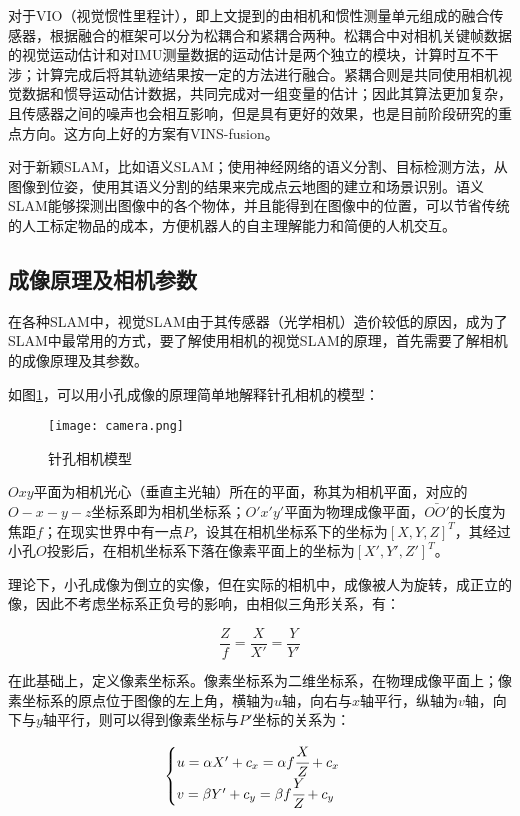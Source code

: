 对于VIO（视觉惯性里程计），即上文提到的由相机和惯性测量单元组成的融合传感器，根据融合的框架可以分为松耦合和紧耦合两种。松耦合中对相机关键帧数据的视觉运动估计和对IMU测量数据的运动估计是两个独立的模块，计算时互不干涉；计算完成后将其轨迹结果按一定的方法进行融合。紧耦合则是共同使用相机视觉数据和惯导运动估计数据，共同完成对一组变量的估计\cite{qin2018vins}；因此其算法更加复杂，且传感器之间的噪声也会相互影响，但是具有更好的效果，也是目前阶段研究的重点方向。这方向上好的方案有VINS-fusion。


对于新颖SLAM，比如语义SLAM；使用神经网络的语义分割、目标检测方法，从图像到位姿，使用其语义分割的结果来完成点云地图的建立和场景识别。语义SLAM能够探测出图像中的各个物体，并且能得到在图像中的位置，可以节省传统的人工标定物品的成本，方便机器人的自主理解能力和简便的人机交互\cite{任伟建2022移动机器人同步定位与建图技术综述}。


\subsection{成像原理及相机参数} \label{3.1.2}
在各种SLAM中，视觉SLAM由于其传感器（光学相机）造价较低的原因，成为了SLAM中最常用的方式，要了解使用相机的视觉SLAM的原理，首先需要了解相机的成像原理及其参数。

如图\ref{fig4}，可以用小孔成像的原理简单地解释针孔相机的模型：
\begin{figure}[!ht]
	\centering
	\texttt{[image: camera.png]}
	\caption{针孔相机模型} 
	\label{fig4}
\end{figure}

$Oxy$平面为相机光心（垂直主光轴）所在的平面，称其为相机平面，对应的$O-x-y-z$坐标系即为相机坐标系；$O'x'y'$平面为物理成像平面，$\bar{OO'}$的长度为焦距$f$；在现实世界中有一点$P$，设其在相机坐标系下的坐标为$[X, Y, Z]^T$，其经过小孔$O$投影后，在相机坐标系下落在像素平面上的坐标为$[X', Y', Z']^T$。

理论下，小孔成像为倒立的实像，但在实际的相机中，成像被人为旋转，成正立的像，因此不考虑坐标系正负号的影响，由相似三角形关系，有：

\begin{equation}
\frac{Z}{f}=\frac{X}{X'}=\frac{Y}{Y'}
\end{equation}


在此基础上，定义像素坐标系。像素坐标系为二维坐标系，在物理成像平面上；像素坐标系的原点位于图像的左上角，横轴为$u$轴，向右与$x$轴平行，纵轴为$v$轴，向下与$y$轴平行，则可以得到像素坐标与$P'$坐标的关系为：

\begin{equation}
\begin{cases}
u=\alpha X'+c_x=\alpha f \cfrac{X}{Z}+c_x \\
v=\beta Y' +c_y=\beta f  \cfrac{Y}{Z}+c_y \\
\end{cases}
\end{equation}


